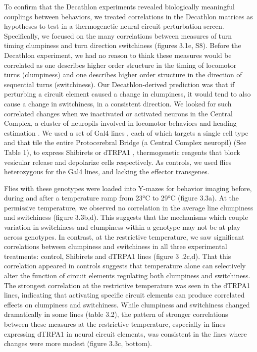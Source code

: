 \documentclass[12pt,letterpaper]{article}
\begin{document}
To confirm that the Decathlon experiments revealed biologically meaningful couplings between behaviors, we treated correlations in the Decathlon matrices as hypotheses to test in a thermogenetic neural circuit perturbation screen. Specifically, we focused on the many correlations between measures of turn timing clumpiness and turn direction switchiness (figures 3.1e, S8). Before the Decathlon experiment, we had no reason to think these measures would be correlated as one describes higher order structure in the timing of locomotor turns (clumpiness) and one describes higher order structure in the direction of sequential turns (switchiness). Our Decathlon-derived prediction was that if perturbing a circuit element caused a change in clumpiness, it would tend to also cause a change in switchiness, in a consistent direction.  We looked for such correlated changes when we inactivated or activated neurons in the Central Complex, a cluster of neuropils involved in locomotor behaviors \cite{Buchanan_Neuronal_2015,Ofstad_Visual_2011,Kottler_Inverse_2019} and heading estimation \cite{Seelig_Neural_2015,green_nature_2017,Kakaria_Ring_2017}. We used a set of Gal4 lines \cite{Wolff_Neuroarchitecture_2018}, each of which targets a single cell type and that tile the entire Protocerebral Bridge (a Central Complex neuropil) (See Table 1), to express Shibirets \cite{of_neurobiology_Conditional_2001} or dTRPA1 \cite{Hamada_An_2008}, thermogenetic reagents that block vesicular release and depolarize cells respectively. As controls, we used flies heterozygous for the Gal4 lines, and lacking the effector transgenes. 

Flies with these genotypes were loaded into Y-mazes for behavior imaging before, during and after a temperature ramp from 23°C to 29°C (figure 3.3a). At the permissive temperature, we observed no correlation in the average line clumpiness and switchiness (figure 3.3b,d). This suggests that the mechanisms which couple variation in switchiness and clumpiness within a genotype may not be at play across genotypes. In contrast, at the restrictive temperature, we saw significant correlations between clumpiness and switchiness in all three experimental treatments: control, Shibirets and dTRPA1 lines (figure 3 .2c,d). That this correlation appeared in controls suggests that temperature alone can selectively alter the function of circuit elements regulating both clumpiness and switchiness. The strongest correlation at the restrictive temperature was seen in the dTRPA1 lines, indicating that activating specific circuit elements can produce correlated effects on clumpiness and switchiness. While clumpiness and switchiness changed dramatically in some lines (table 3.2), the pattern of stronger correlations between these measures at the restrictive temperature, especially in lines expressing dTRPA1 in neural circuit elements, was consistent in the lines where changes were more modest (figure 3.3c, bottom). 
\end{document}
